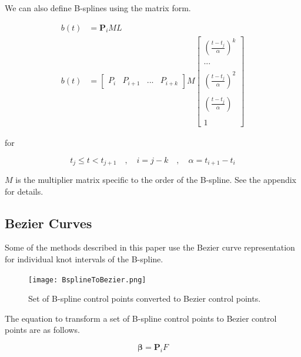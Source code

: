 \documentclass{article}
\begin{document}
  We can also define B-splines using the matrix form.
  
\begin{equation}
\begin{aligned}
        b(t) & = \textbf{P}_i M L \\
           b(t) & = \begin{bmatrix} P_{i} & P_{i+1} & ... & P_{i+k}\end{bmatrix} M \begin{bmatrix} (\frac{t-t_j}{\alpha})^k \\ \\ ... \\ \\ (\frac{t-t_j}{\alpha})^2 \\ \\ (\frac{t-t_j}{\alpha}) \\ \\ 1 \end{bmatrix}
\end{aligned}
\end{equation}

for 

    \begin{equation}
        t_j \leq t < t_{j+1} \quad , \quad i = j-k \quad , \quad \alpha = t_{i+1} - t_i
    \end{equation}

\(M\) is the multiplier matrix specific to the order of the B-spline. See the appendix for details.

\subsection{Bezier Curves}
    Some of the methods described in this paper use the Bezier curve representation for individual knot intervals of the B-spline.
    
\begin{figure}[H]
\begin{center}
\texttt{[image: BsplineToBezier.png]}
\end{center}
\caption{Set of B-spline control points converted to Bezier control points.}
\label{Fig:BsplineToBezier}
\end{figure}

The equation to transform a set of B-spline control points to Bezier control points are as follows.

\begin{equation}
    \boldsymbol{\beta} = \textbf{P}_i F
\end{equation}
\end{document}
